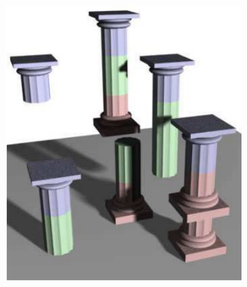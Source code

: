 \documentclass[b5paper,twoside,11pt]{article}
\begin{document}
\begin{figure}[!h]
\begin{subfigure}[b]{0.3\textwidth}
		\includegraphics[width=\textwidth]{1b}
		\caption{}
		\label{fig:1b}
	\end{subfigure}
	~ %
	\begin{subfigure}[b]{0.3\textwidth}

\end{subfigure}
\end{figure}
\end{document}
